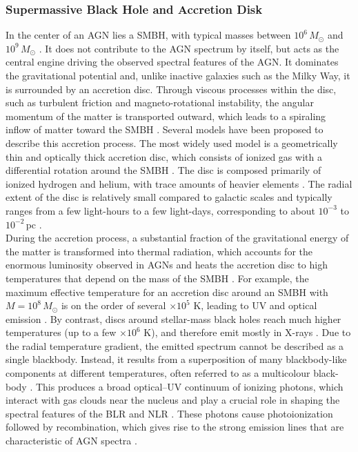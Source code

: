 \subsubsection{Supermassive Black Hole and Accretion Disk}

In the center of an AGN lies a SMBH, with typical masses between $10^6\,M_\odot$ and $10^{9}\,M_\odot$ \parencite{peterson2004}. It does not contribute to the AGN spectrum by itself, but acts as the central engine driving the observed spectral features of the AGN. It dominates the gravitational potential and, unlike inactive galaxies such as the Milky Way, it is surrounded by an accretion disc. Through viscous processes within the disc, such as turbulent friction and magneto-rotational instability, the angular momentum of the matter is transported outward, which leads to a spiraling inflow of matter toward the SMBH \parencite{shakura1973black}. 
Several models have been proposed to describe this accretion process. The most widely used model is a geometrically thin and optically thick accretion disc, which consists of ionized gas with a differential rotation around the SMBH \parencite{shakura1973black, netzer2013agn}. The disc is composed primarily of ionized hydrogen and helium, with trace amounts of heavier elements \parencite{netzer2013agn}. The radial extent of the disc is relatively small compared to galactic scales and typically ranges from a few light-hours to a few light-days, corresponding to about $10^{-3}$ to $10^{-2}$\,pc \parencite{shakura1973black, netzer2013agn}.  \\
During the accretion process, a substantial fraction of the gravitational energy of the matter is transformed into thermal radiation, which accounts for the enormous luminosity observed in AGNs and heats the accretion disc to high temperatures that depend on the mass of the SMBH \parencite{netzer2013agn}. For example, the maximum effective temperature for an accretion disc around an SMBH with $M = 10^8\,M_\odot$ is on the order of several $\times 10^5$ K, leading to UV and optical emission \parencite{shakura1973black, netzer2013agn}. By contrast, discs around stellar-mass black holes reach much higher temperatures (up to a few $\times 10^6$ K), and therefore emit mostly in X-rays \parencite{shakura1973black, netzer2013agn}. Due to the radial temperature gradient, the emitted spectrum cannot be described as a single blackbody. Instead, it results from a superposition of many blackbody-like components at different temperatures, often referred to as a multicolour black-body \parencite{netzer2013agn}. This produces a broad optical–UV continuum of ionizing photons, which interact with gas clouds near the nucleus and play a crucial role in shaping the spectral features of the BLR and NLR \parencite{netzer2013agn}. These photons cause photoionization followed by recombination, which gives rise to the strong emission lines that are characteristic of AGN spectra \parencite{netzer2013agn}.

